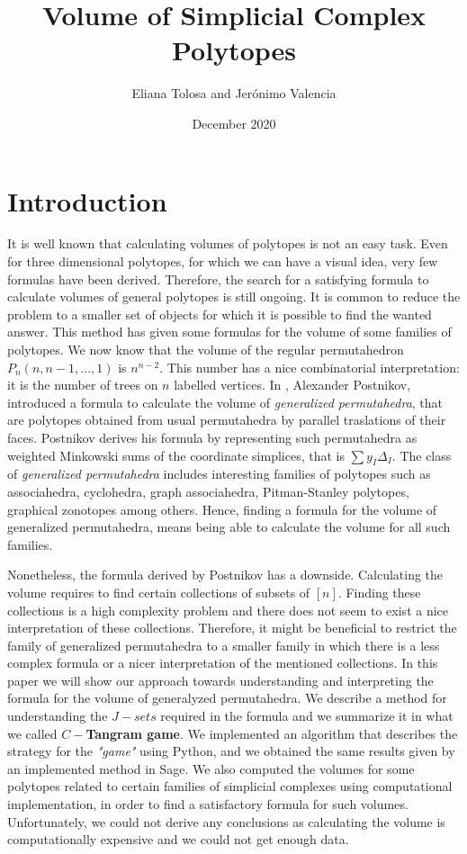 \documentclass[english,11pt]{article}
\title{Volume of Simplicial Complex Polytopes}
\author{Eliana Tolosa and Jerónimo Valencia}
\date{December 2020}
\theoremstyle{definition}
\theoremstyle{definition}
\theoremstyle{definition}
\theoremstyle{remark}
\theoremstyle{definition}
\begin{document}
\maketitle

\section{Introduction}

It is well known that calculating volumes of polytopes is not an easy task. Even for three dimensional polytopes, for which we can have a visual idea, very few formulas have been derived. Therefore, the search for a satisfying formula to calculate volumes of general polytopes is still ongoing. It is common to reduce the problem to a smaller set of objects for which it is possible to find the wanted answer. This method has given some formulas for the volume of some families of polytopes. We now know that the volume of the regular permutahedron $P_n(n, n-1,\dots, 1)$ is $n^{n-2}$. This number has a nice combinatorial interpretation: it is the number of trees on $n$ labelled vertices. In \cite{Postnikov-PAB}, Alexander Postnikov, introduced a formula to calculate the volume of \textit{generalized permutahedra}, that are polytopes obtained from usual permutahedra by parallel traslations of their faces. Postnikov derives his formula by representing such permutahedra as weighted Minkowski sums of the coordinate simplices, that is $\sum y_I \Delta_I$. The class of \textit{generalized permutahedra} includes interesting families of polytopes such as associahedra, cyclohedra, graph associahedra, Pitman-Stanley polytopes, graphical zonotopes among others. Hence, finding a formula for the volume of generalized permutahedra, means being able to calculate the volume for all such families.

Nonetheless, the formula derived by Postnikov has a downside. Calculating the volume requires to find certain collections of subsets of $[n]$. Finding these collections is a high complexity problem and there does not seem to exist a nice interpretation of these collections. Therefore, it might be beneficial to restrict the family of generalized permutahedra to a smaller family in which there is a less complex formula or a nicer interpretation of the mentioned collections.
In this paper we will show our approach towards understanding and interpreting the formula for the volume of generalyzed permutahedra. We describe a method for understanding the $J-sets$ required in the formula and we summarize it in what we called $C-$\textbf{Tangram game}. We implemented an algorithm that describes the strategy for the \textit{"game"} using Python, and we obtained the same results given by an implemented method in Sage. We also computed the volumes for some polytopes related to certain families of simplicial complexes using computational implementation, in order to find a satisfactory formula for such volumes. Unfortunately, we could not derive any conclusions as calculating the volume is computationally expensive and we could not get enough data.
\end{document}

